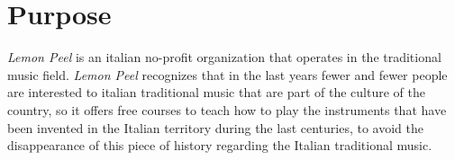 \documentclass[../../DD.tex]{subfiles}
\begin{document}
\section{Purpose}
\textit{Lemon Peel} is an italian no-profit organization that operates in the traditional music field. \textit{Lemon Peel} recognizes that in the last years fewer and fewer people are interested to italian traditional music that are part of the culture of the country, so it offers free courses to teach how to play the instruments that have been invented in the Italian territory during the last centuries, to avoid the disappearance of this piece of history regarding the Italian traditional music. 
\end{document}
